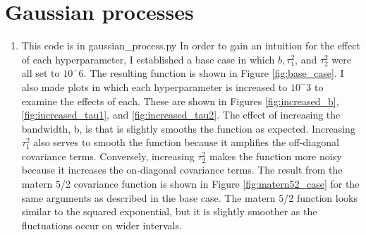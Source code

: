 \documentclass[10pt]{article}
\begin{document}
		\section{Gaussian processes}
        \begin{enumerate}[label=(\Alph*)]
        \item This code is in gaussian\_process.py
        In order to gain an intuition for the effect of each hyperparameter, I established a base case in which $b, \tau_1^2$, and $\tau_2^2$ were all set to $10^-6$. The resulting function is shown in Figure \ref{fig:base_case}. I also made plots in which each hyperparameter is increased to $10^-3$ to examine the effects of each. These are shown in Figures \ref{fig:increased_b}, \ref{fig:increased_tau1}, and \ref{fig:increased_tau2}. The effect of increasing the bandwidth, b, is that is slightly smooths the function as expected. Increasing $\tau_1^2$ also serves to smooth the function because it amplifies the off-diagonal covariance terms. Conversely, increasing $\tau_2^2$ makes the function more noisy because it increases the on-diagonal covariance terms. The result from the matern 5/2 covariance function is shown in Figure \ref{fig:matern52_case} for the same arguments as described in the base case. The matern 5/2 function looks similar to the squared exponential, but it is slightly smoother as the fluctuations occur on wider intervals. 
        

\end{enumerate}
\end{document}
